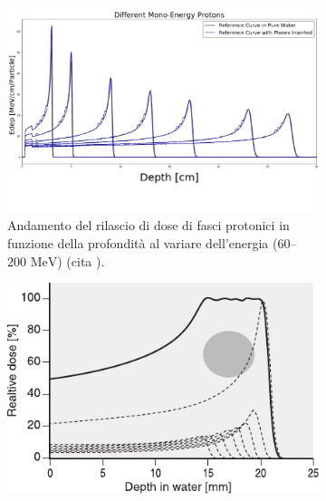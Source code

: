 \documentclass[12pt,a4paper,twoside]{report}
\begin{document}
	\begin{figure}[H]
		\centering
		\begin{subfigure}[t]{0.49\textwidth}
			\centering
			\includegraphics[width=\textwidth, scale=0.50]{bragg_peak_energies.jpg}
			\caption{Andamento del rilascio di dose di fasci protonici in funzione della profondità al variare dell'energia ($60$--$200\mbox{ MeV}$) (cita
				).}
			\label{fig:bragg_peak_energies}
		\end{subfigure}
		\hfill
		\begin{subfigure}[t]{0.49\textwidth}
			\centering
			\includegraphics[width=\textwidth, scale=0.50]{sobp.pdf}

\end{subfigure}
\end{figure}
\end{document}
